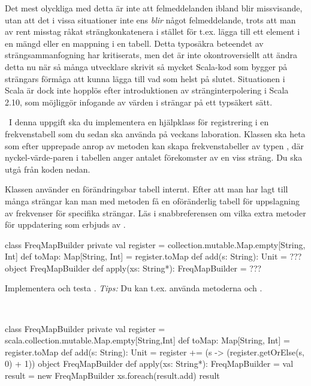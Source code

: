 Det mest olyckliga med detta är inte att felmeddelanden ibland blir missvisande, utan att det i vissa situationer inte ens \emph{blir} något felmeddelande, trots att man av rent misstag råkat strängkonkatenera i stället för t.ex. lägga till ett element i en mängd eller en mappning i en tabell. Detta typosäkra beteendet av strängsammanfogning har kritiserats, men det är inte okontroversiellt att ändra detta nu när så många utvecklare skrivit så mycket Scala-kod som bygger på strängars förmåga att kunna lägga till vad som helst på slutet. Situationen i Scala är dock inte hopplös efter introduktionen av stränginterpolering i Scala 2.10, som möjliggör infogande av värden i strängar på ett typsäkert sätt.
\QUESTEND






\QUESTBEGIN

\Task \what~I denna uppgift ska du implementera en hjälpklass för registrering i en frekvenstabell som du sedan ska använda på veckans laboration. Klassen ska heta   som efter upprepade anrop av metoden  kan skapa frekvenstabeller av typen , där nyckel-värde-paren i tabellen anger antalet förekomster av en viss sträng. Du ska utgå från koden nedan.

Klassen använder en förändringsbar tabell internt. Efter att man har lagt till många strängar kan man med metoden  få en oföränderlig tabell för  uppslagning av frekvenser för specifika strängar. Läs i snabbreferensen om vilka extra metoder för uppdatering som erbjuds av .

\begin{Code}
class FreqMapBuilder {
  private val register = collection.mutable.Map.empty[String, Int]
  def toMap: Map[String, Int] = register.toMap
  def add(s: String): Unit = ???
}
object FreqMapBuilder {
  def apply(xs: String*): FreqMapBuilder = ???
}
\end{Code}

\noindent Implementera och testa . \emph{Tips:} Du kan t.ex. använda metoderna \code{+=} och .

\SOLUTION

\TaskSolved \what~
\begin{Code}
class FreqMapBuilder {
  private val register = scala.collection.mutable.Map.empty[String,Int]
  def toMap: Map[String, Int] = register.toMap
  def add(s: String): Unit =
    register += (s -> (register.getOrElse(s, 0) + 1))
}
object FreqMapBuilder {
  def apply(xs: String*): FreqMapBuilder = {
    val result = new FreqMapBuilder
    xs.foreach(result.add)
    result
  }
}
\end{Code}

